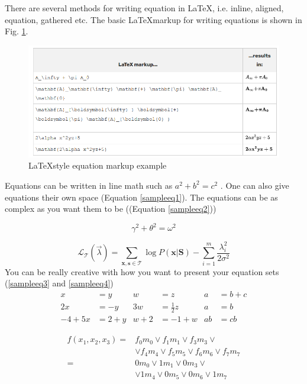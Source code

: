 \documentclass[a4paper, 12pt, one column]{article}
\begin{document}
    There are several methods for writing equation in \LaTeX, i.e. inline, aligned, equation, gathered etc. The basic \LaTeX markup for writing equations is shown in Fig. \ref{eqDemo}. 

    \begin{figure}[!httb]
        \centering
        \includegraphics[width=0.8\linewidth]{eqDemo.png}
        \caption{ \LaTeX \space style equation markup example}
        \label{eqDemo}
        \end{figure}

    Equations can be written in line math such as $a^2+b^2=c^2$ . One can also give equations their own space (Equation \ref{sampleeq1}). The equations can be as complex as you want them to be ((Equation \ref{sampleeq2}))

   \begin{equation} 
   \gamma^2+\theta^2=\omega^2
   \label{sampleeq1}
   \end{equation}

   \begin{equation} 
    \mathcal{L}_{\mathcal{T}}(\vec{\lambda}) = \sum_{\mathbf{x},\mathbf{s}\in\mathcal{T}} \log P(\mathbf{x}|\mathbf{S}) - \sum_{i=1}^m \frac{\lambda_i^2}{2\sigma^2}
    \label{sampleeq2}
  \end{equation}
You can be really creative with how you want to present your equation sets (\ref{sampleeq3} and \ref{sampleeq4})
  \begin{align} 
    \label{sampleeq3}
    x&=y           &  w &=z              &  a&=b+c \nonumber \\
    2x&=-y         &  3w&=\frac{1}{2}z   &  a&=b\\
    -4 + 5x&=2+y   &  w+2&=-1+w          &  ab&=cb \nonumber
    \end{align}

    \begin{align}
        \label{sampleeq4}
        f(x_1, x_2, x_3) = & f_0 m_0 \vee f_1 m_1 \vee f_3 m_3 \vee \nonumber \\
          & \vee f_4 m_4 \vee f_5 m_5 \vee f_6 m_6 \vee f_7 m_7 \nonumber \\
        = & 0 m_0 \vee 1 m_1 \vee 0 m_3 \vee \\
          & \vee 1 m_4 \vee 0 m_5 \vee 0 m_6 \vee 1 m_7 \nonumber 
    \end{align}
\end{document}
